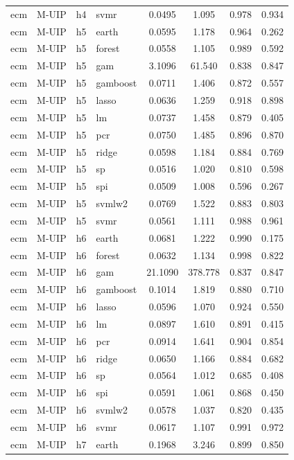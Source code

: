\begin{ThreePartTable}
\begin{longtable}[t]{llclcccc}
ecm & M-UIP & h4 & svmr & 0.0495 & 1.095 & 0.978 & 0.934\\
\addlinespace
ecm & M-UIP & h5 & earth & 0.0595 & 1.178 & 0.964 & 0.262\\
ecm & M-UIP & h5 & forest & 0.0558 & 1.105 & 0.989 & 0.592\\
ecm & M-UIP & h5 & gam & 3.1096 & 61.540 & 0.838 & 0.847\\
ecm & M-UIP & h5 & gamboost & 0.0711 & 1.406 & 0.872 & 0.557\\
ecm & M-UIP & h5 & lasso & 0.0636 & 1.259 & 0.918 & 0.898\\
ecm & M-UIP & h5 & lm & 0.0737 & 1.458 & 0.879 & 0.405\\
ecm & M-UIP & h5 & pcr & 0.0750 & 1.485 & 0.896 & 0.870\\
ecm & M-UIP & h5 & ridge & 0.0598 & 1.184 & 0.884 & 0.769\\
ecm & M-UIP & h5 & sp & 0.0516 & 1.020 & 0.810 & 0.598\\
ecm & M-UIP & h5 & spi & 0.0509 & 1.008 & 0.596 & 0.267\\
ecm & M-UIP & h5 & svmlw2 & 0.0769 & 1.522 & 0.883 & 0.803\\
ecm & M-UIP & h5 & svmr & 0.0561 & 1.111 & 0.988 & 0.961\\
\addlinespace
ecm & M-UIP & h6 & earth & 0.0681 & 1.222 & 0.990 & 0.175\\
ecm & M-UIP & h6 & forest & 0.0632 & 1.134 & 0.998 & 0.822\\
ecm & M-UIP & h6 & gam & 21.1090 & 378.778 & 0.837 & 0.847\\
ecm & M-UIP & h6 & gamboost & 0.1014 & 1.819 & 0.880 & 0.710\\
ecm & M-UIP & h6 & lasso & 0.0596 & 1.070 & 0.924 & 0.550\\
ecm & M-UIP & h6 & lm & 0.0897 & 1.610 & 0.891 & 0.415\\
ecm & M-UIP & h6 & pcr & 0.0914 & 1.641 & 0.904 & 0.854\\
ecm & M-UIP & h6 & ridge & 0.0650 & 1.166 & 0.884 & 0.682\\
ecm & M-UIP & h6 & sp & 0.0564 & 1.012 & 0.685 & 0.408\\
ecm & M-UIP & h6 & spi & 0.0591 & 1.061 & 0.868 & 0.450\\
ecm & M-UIP & h6 & svmlw2 & 0.0578 & 1.037 & 0.820 & 0.435\\
ecm & M-UIP & h6 & svmr & 0.0617 & 1.107 & 0.991 & 0.972\\
\addlinespace
ecm & M-UIP & h7 & earth & 0.1968 & 3.246 & 0.899 & 0.850\\

\end{longtable}
\end{ThreePartTable}
